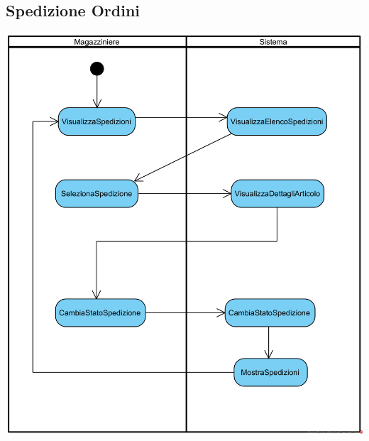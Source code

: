 \documentclass[12pt,a4paper]{article}
\begin{document}
\subsection{Spedizione Ordini}
\begin{center}
\includegraphics[width=\textwidth]{ActivityDiagram/MagazziniereSpedizioneOrdine}
\end{center}
\end{document}
